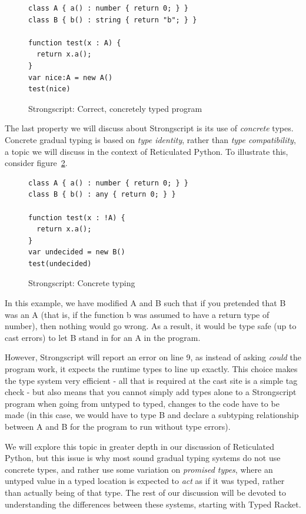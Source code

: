 \documentclass[preprint]{sigplanconf}
\begin{document}
\begin{figure}[h]
\begin{verbatim}
class A { a() : number { return 0; } }
class B { b() : string { return "b"; } }

function test(x : A) {
  return x.a();
}
var nice:A = new A()
test(nice)
\end{verbatim}
\caption{Strongscript: Correct, concretely typed program}
\label{fig:ssex3}
\end{figure}

The last property we will discuss about Strongscript is its use of 
\emph{concrete} types. Concrete gradual typing is based on \emph{type identity},
rather than \emph{type compatibility}, a topic we will discuss in the context of
Reticulated Python. To illustrate this, consider figure~\ref{fig:ssex4}.

\begin{figure}[h]
\begin{verbatim}
class A { a() : number { return 0; } }
class B { b() : any { return 0; } }

function test(x : !A) {
  return x.a();
}
var undecided = new B()
test(undecided)
\end{verbatim}
\caption{Strongscript: Concrete typing}
\label{fig:ssex4}
\end{figure}

In this example, we have modified A and B such that if you pretended that B
was an A (that is, if the function b was assumed to have a return type
of number), then nothing would go wrong. As a result, it would be type
safe (up to cast errors) to let B stand in for an A in the program.

However, Strongscript will report an error on line 9, as instead of asking
\emph{could} the program work, it expects the runtime types to line up exactly.
This choice makes the type system very efficient - all that is required
at the cast site is a simple tag check - but also means that you cannot simply
add types alone to a Strongscript program when going from untyped to typed,
changes to the code have to be made (in this case, we would have to type
B and declare a subtyping relationship between A and B for the program to
run without type errors).

We will explore this topic in greater depth in our discussion of Reticulated
Python, but this issue is why most sound gradual typing systems do not use
concrete types, and rather use some variation on \emph{promised types}, 
where an untyped value in a typed location is expected to \emph{act} as
if it was typed, rather than actually being of that type. The rest of our
discussion will be devoted to understanding the differences between these 
systems, starting with Typed Racket.
\end{document}
